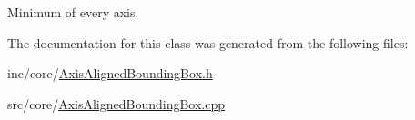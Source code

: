 Minimum of every axis. 



The documentation for this class was generated from the following files\+:\begin{DoxyCompactItemize}
\item 
inc/core/\hyperlink{_axis_aligned_bounding_box_8h}{Axis\+Aligned\+Bounding\+Box.\+h}\item 
src/core/\hyperlink{_axis_aligned_bounding_box_8cpp}{Axis\+Aligned\+Bounding\+Box.\+cpp}\end{DoxyCompactItemize}
